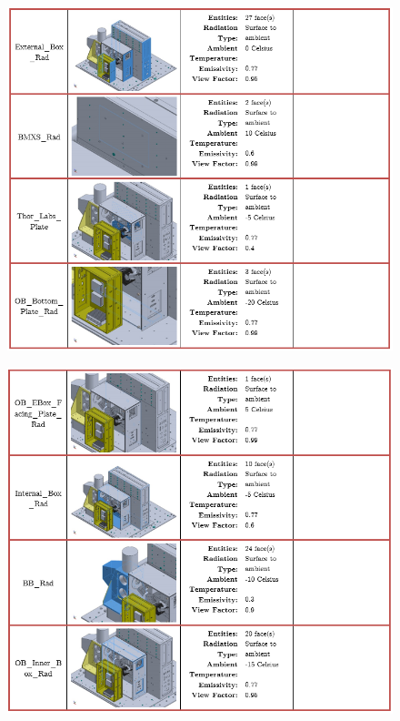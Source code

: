 \begin{figure}
    \centering
    \includegraphics[width=\textwidth]{thermal_load_images/float_TL_images/float_5.PNG}
\end{figure}

\begin{figure}
    \centering
    \includegraphics[width=\textwidth]{thermal_load_images/float_TL_images/float_6.PNG}
\end{figure}

